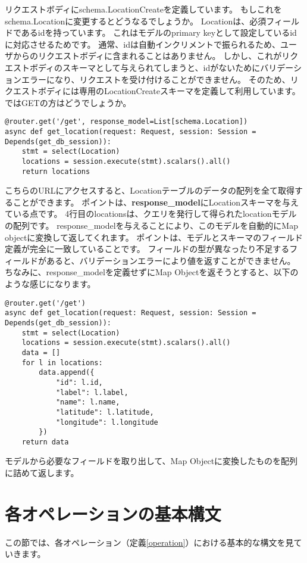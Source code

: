 リクエストボディにschema.LocationCreateを定義しています。
もしこれをschema.Locationに変更するとどうなるでしょうか。
Locationは、必須フィールドであるidを持っています。
これはモデルのprimary keyとして設定しているidに対応させるためです。
通常、idは自動インクリメントで振られるため、ユーザからのリクエストボディに含まれることはありません。
しかし、これがリクエストボディのスキーマとして与えられてしまうと、idがないためにバリデーションエラーになり、リクエストを受け付けることができません。
そのため、リクエストボディには専用のLocationCreateスキーマを定義して利用しています。
ではGETの方はどうでしょうか。

\begin{lstlisting}[caption=Get Location List]
@router.get('/get', response_model=List[schema.Location])
async def get_location(request: Request, session: Session = Depends(get_db_session)):
    stmt = select(Location)
    locations = session.execute(stmt).scalars().all()
    return locations
\end{lstlisting}


こちらのURLにアクセスすると、Locationテーブルのデータの配列を全て取得することができます。
ポイントは、\textbf{response\_model}にLocationスキーマを与えている点です。
4行目のlocationsは、クエリを発行して得られたlocationモデルの配列です。
response\_modelを与えることにより、このモデルを自動的にMap objectに変換して返してくれます。
ポイントは、モデルとスキーマのフィールド定義が完全に一致していることです。
フィールドの型が異なったり不足するフィールドがあると、バリデーションエラーにより値を返すことができません。
ちなみに、response\_modelを定義せずにMap Objectを返そうとすると、以下のような感じになります。

\begin{lstlisting}[caption=スキーマを使わないGET]
@router.get('/get')
async def get_location(request: Request, session: Session = Depends(get_db_session)):
    stmt = select(Location)
    locations = session.execute(stmt).scalars().all()
    data = []
    for l in locations:
        data.append({
            "id": l.id,
            "label": l.label,
            "name": l.name,
            "latitude": l.latitude,
            "longitude": l.longitude
        })
    return data
\end{lstlisting}

モデルから必要なフィールドを取り出して、Map Objectに変換したものを配列に詰めて返します。


\section{各オペレーションの基本構文}
この節では、各オペレーション（定義\ref{operation}）における基本的な構文を見ていきます。


